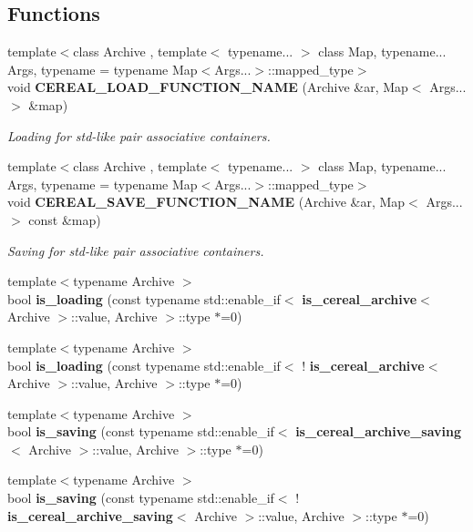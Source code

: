 \subsection*{Functions}
\begin{DoxyCompactItemize}
\item 
{\footnotesize template$<$class Archive , template$<$ typename... $>$ class Map, typename... Args, typename  = typename Map$<$\+Args...$>$\+::mapped\+\_\+type$>$ }\\void \textbf{ C\+E\+R\+E\+A\+L\+\_\+\+L\+O\+A\+D\+\_\+\+F\+U\+N\+C\+T\+I\+O\+N\+\_\+\+N\+A\+ME} (Archive \&ar, Map$<$ Args... $>$ \&map)
\begin{DoxyCompactList}\small\item\em Loading for std-\/like pair associative containers. \end{DoxyCompactList}\item 
{\footnotesize template$<$class Archive , template$<$ typename... $>$ class Map, typename... Args, typename  = typename Map$<$\+Args...$>$\+::mapped\+\_\+type$>$ }\\void \textbf{ C\+E\+R\+E\+A\+L\+\_\+\+S\+A\+V\+E\+\_\+\+F\+U\+N\+C\+T\+I\+O\+N\+\_\+\+N\+A\+ME} (Archive \&ar, Map$<$ Args... $>$ const \&map)
\begin{DoxyCompactList}\small\item\em Saving for std-\/like pair associative containers. \end{DoxyCompactList}\item 
{\footnotesize template$<$typename Archive $>$ }\\bool \textbf{ is\+\_\+loading} (const typename std\+::enable\+\_\+if$<$ \textbf{ is\+\_\+cereal\+\_\+archive}$<$ Archive $>$\+::value, Archive $>$\+::type $\ast$=0)
\item 
{\footnotesize template$<$typename Archive $>$ }\\bool \textbf{ is\+\_\+loading} (const typename std\+::enable\+\_\+if$<$ !\textbf{ is\+\_\+cereal\+\_\+archive}$<$ Archive $>$\+::value, Archive $>$\+::type $\ast$=0)
\item 
{\footnotesize template$<$typename Archive $>$ }\\bool \textbf{ is\+\_\+saving} (const typename std\+::enable\+\_\+if$<$ \textbf{ is\+\_\+cereal\+\_\+archive\+\_\+saving}$<$ Archive $>$\+::value, Archive $>$\+::type $\ast$=0)
\item 
{\footnotesize template$<$typename Archive $>$ }\\bool \textbf{ is\+\_\+saving} (const typename std\+::enable\+\_\+if$<$ !\textbf{ is\+\_\+cereal\+\_\+archive\+\_\+saving}$<$ Archive $>$\+::value, Archive $>$\+::type $\ast$=0)

\end{DoxyCompactItemize}
